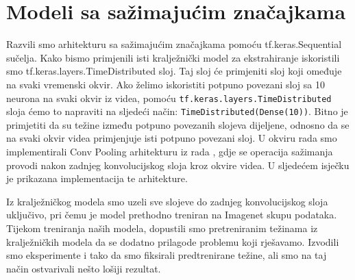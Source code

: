 \documentclass[times, utf8, diplomski,  numeric]{fer}
\begin{document}
\section{Modeli sa sažimajućim značajkama}
Razvili smo arhitekturu sa sažimajućim značajkama pomoću tf.keras.Sequential sučelja. Kako bismo primjenili isti kralježnički model za ekstrahiranje iskoristili smo tf.keras.layers.TimeDistributed sloj. Taj sloj će primjeniti sloj koji omeđuje na svaki vremenski okvir. Ako želimo iskoristiti potpuno povezani sloj sa 10 neurona na svaki okvir iz videa, pomoću \verb|tf.keras.layers.TimeDistributed| sloja ćemo to napraviti na sljedeći način: \verb|TimeDistributed(Dense(10))|. Bitno je primjetiti da su težine između potpuno povezanih slojeva dijeljene, odnosno da se na svaki okvir videa primjenjuje isti potpuno povezani sloj. U okviru rada smo implementirali Conv Pooling arhitekturu iz rada \cite{feature-pooling}, gdje se operacija sažimanja provodi nakon zadnjeg konvolucijskog sloja kroz okvire videa. U sljedećem isječku je prikazana implementacija te arhitekture.

Iz kralježničkog modela smo uzeli sve slojeve do zadnjeg konvolucijskog sloja uključivo, pri čemu je model prethodno treniran na Imagenet skupu podataka. Tijekom treniranja naših modela, dopustili smo pretreniranim težinama iz kralježničkih modela da se dodatno prilagode problemu koji rješavamo. Izvodili smo eksperimente i tako da smo fiksirali predtrenirane težine, ali smo na taj način ostvarivali nešto lošiji rezultat.
\newpage
\end{document}

